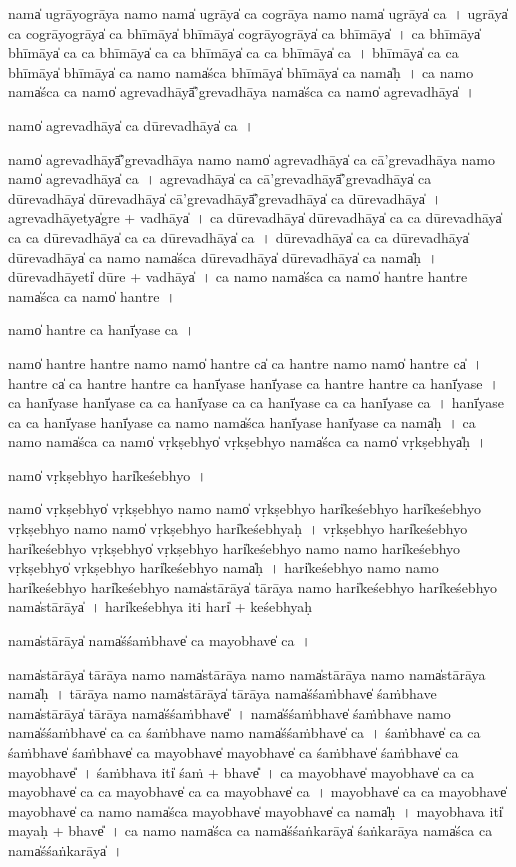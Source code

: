 \documentclass[parskip, DIV=14]{scrartcl}
\begin{document}
{nama̍ u॒grāyo॒grāya॒ namo॒ nama̍ u॒grāya̍ ca co॒grāya॒ namo॒ nama̍ u॒grāya̍ ca~।
u॒grāya̍ ca co॒grāyo॒grāya̍ ca bhī॒māya̍ bhī॒māya̍ co॒grāyo॒grāya̍ ca bhī॒māya̍~।
ca॒ bhī॒māya̍ bhī॒māya̍ ca ca bhī॒māya̍ ca ca bhī॒māya̍ ca ca bhī॒māya̍ ca~।
bhī॒māya̍ ca ca bhī॒māya̍ bhī॒māya̍ ca॒ namo॒ nama̍śca bhī॒māya̍ bhī॒māya̍ ca॒ nama̍ḥ~।
ca॒ namo॒ nama̍śca ca॒ namo̍ agreva॒dhāyā̎'greva॒dhāya॒ nama̍śca ca॒ namo̍ agreva॒dhāya̍~।

namo̍ agreva॒dhāya̍ ca dūreva॒dhāya̍ ca॒~।

namo̍ agreva॒dhāyā̎'greva॒dhāya॒ namo॒ namo̍ agreva॒dhāya̍ ca cā'greva॒dhāya॒ namo॒ namo̍ agreva॒dhāya̍ ca~।
a॒gre॒va॒dhāya̍ ca cā'greva॒dhāyā̎'greva॒dhāya̍ ca dūreva॒dhāya̍ dūreva॒dhāya̍ cā'greva॒dhāyā̎'greva॒dhāya̍ ca dūreva॒dhāya̍~।
a॒gre॒va॒dhāyetya̍gre + va॒dhāya̍~।
ca॒ dū॒re॒va॒dhāya̍ dūreva॒dhāya̍ ca ca dūreva॒dhāya̍ ca ca dūreva॒dhāya̍ ca ca dūreva॒dhāya̍ ca~।
dū॒re॒va॒dhāya̍ ca ca dūreva॒dhāya̍ dūreva॒dhāya̍ ca॒ namo॒ nama̍śca dūreva॒dhāya̍ dūreva॒dhāya̍ ca॒ nama̍ḥ~।
dū॒re॒va॒dhāyeti̍ dūre + va॒dhāya̍~। 
ca॒ namo॒ nama̍śca ca॒ namo̍ ha॒ntre ha॒ntre nama̍śca ca॒ namo̍ ha॒ntre~।

namo̍ ha॒ntre ca॒ hanī̍yase ca॒~।

namo̍ ha॒ntre ha॒ntre namo॒ namo̍ ha॒ntre ca̍ ca ha॒ntre namo॒ namo̍ ha॒ntre ca̍~।
ha॒ntre ca̍ ca ha॒ntre ha॒ntre ca॒ hanī̍yase॒ hanī̍yase ca ha॒ntre ha॒ntre ca॒ hanī̍yase~।
ca॒ hanī̍yase॒ hanī̍yase ca ca॒ hanī̍yase ca ca॒ hanī̍yase ca ca॒ hanī̍yase ca~।
hanī̍yase ca ca॒ hanī̍yase॒ hanī̍yase ca॒ namo॒ nama̍śca॒ hanī̍yase॒ hanī̍yase ca॒ nama̍ḥ~।
ca॒ namo॒ nama̍śca ca॒ namo̍ vṛ॒kṣebhyo̍ vṛ॒kṣebhyo॒ nama̍śca ca॒ namo̍ vṛ॒kṣebhya̍ḥ~।

namo̍ vṛ॒kṣebhyo॒ hari̍keśebhyo॒~।

namo̍ vṛ॒kṣebhyo̍ vṛ॒kṣebhyo॒ namo॒ namo̍ vṛ॒kṣebhyo॒ hari̍keśebhyo॒ hari̍keśebhyo vṛ॒kṣebhyo॒ namo॒ namo̍ vṛ॒kṣebhyo॒ hari̍keśebhyaḥ~।
vṛ॒kṣebhyo॒ hari̍keśebhyo॒ hari̍keśebhyo vṛ॒kṣebhyo̍ vṛ॒kṣebhyo॒ hari̍keśebhyo॒  namo॒ namo॒ hari̍keśebhyo vṛ॒kṣebhyo̍ vṛ॒kṣebhyo॒ hari̍keśebhyo॒  nama̍ḥ~।
hari̍keśebhyo॒  namo॒ namo॒ hari̍keśebhyo॒ hari̍keśebhyo॒ nama̍stā॒rāya̍ tā॒rāya॒ namo॒ hari̍keśebhyo॒ hari̍keśebhyo॒ nama̍stā॒rāya̍~।
hari̍keśebhya॒ iti॒ hari̍ + ke॒śe॒bhya॒ḥ

nama̍stā॒rāya̍ nama̍śśa॒ṁbhave̍ ca mayo॒bhave̍ ca॒~।

nama̍stā॒rāya̍ tā॒rāya॒ namo॒ nama̍stā॒rāya॒ namo॒ nama̍stā॒rāya॒ namo॒ nama̍stā॒rāya॒ nama̍ḥ~।
tā॒rāya॒ namo॒ nama̍stā॒rāya̍ tā॒rāya॒ nama̍śśa॒ṁbhave̍ śa॒ṁbhave॒ nama̍stā॒rāya̍ tā॒rāya॒ nama̍śśa॒ṁbhave̎~।
nama̍śśa॒ṁbhave̍ śa॒ṁbhave॒ namo॒ nama̍śśa॒ṁbhave̍ ca ca śa॒ṁbhave॒ namo॒ nama̍śśa॒ṁbhave̍ ca~।
śa॒ṁbhave̍ ca ca śa॒ṁbhave̍ śa॒ṁbhave̍ ca॒ mayo॒bhave̍ mayo॒bhave̍ ca śa॒ṁbhave̍ śa॒ṁbhave̍ ca॒ mayo॒bhave̎~।
śa॒ṁbhava॒ iti̍ śaṁ + bhave̎~।
ca॒ ma॒yo॒bhave̍ mayo॒bhave̍ ca ca mayo॒bhave̍ ca ca mayo॒bhave̍ ca ca mayo॒bhave̍ ca~।
mayo॒bhave̍ ca ca mayo॒bhave̍ mayo॒bhave̍ ca॒ namo॒ nama̍śca mayo॒bhave̍ mayo॒bhave̍ ca॒ nama̍ḥ~।
ma॒yo॒bhava॒ iti̍ mayaḥ + bhave̎~।
ca॒ namo॒ nama̍śca ca॒ nama̍śśaṅka॒rāya̍ śaṅka॒rāya॒ nama̍śca ca॒ nama̍śśaṅka॒rāya̍~।

}
\end{document}
